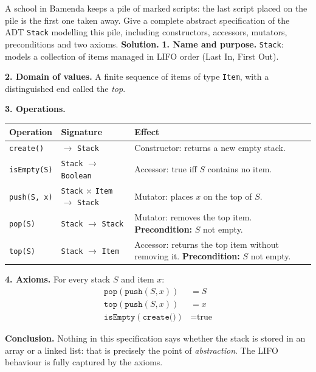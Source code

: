 \documentclass[11pt]{article}
\newcommand{\cle}[1]{{\popxbold\color{popdark}#1}}
\begin{document}
\begin{exoresolu}
A school in Bamenda keeps a pile of marked scripts: the last script placed on the pile is the first one taken away. Give a complete abstract specification of the ADT \texttt{Stack} modelling this pile, including constructors, accessors, mutators, preconditions and two axioms.
\tcblower
\textbf{Solution.}
\textbf{1. Name and purpose.} \texttt{Stack}: models a collection of items managed in \cle{LIFO} order (Last In, First Out).

\textbf{2. Domain of values.} A finite sequence of items of type \texttt{Item}, with a distinguished end called the \emph{top}.

\textbf{3. Operations.}
\begin{center}
\begin{tabularx}{\linewidth}{|l|l|X|}
\hline
\rowcolor{popblueL} \textbf{Operation} & \textbf{Signature} & \textbf{Effect} \\
\hline
\texttt{create()} & $\rightarrow$ \texttt{Stack} & Constructor: returns a new empty stack. \\
\hline
\texttt{isEmpty(S)} & \texttt{Stack} $\rightarrow$ \texttt{Boolean} & Accessor: true iff $S$ contains no item. \\
\hline
\texttt{push(S, x)} & \texttt{Stack} $\times$ \texttt{Item} $\rightarrow$ \texttt{Stack} & Mutator: places $x$ on the top of $S$. \\
\hline
\texttt{pop(S)} & \texttt{Stack} $\rightarrow$ \texttt{Stack} & Mutator: removes the top item. \textbf{Precondition:} $S$ not empty. \\
\hline
\texttt{top(S)} & \texttt{Stack} $\rightarrow$ \texttt{Item} & Accessor: returns the top item without removing it. \textbf{Precondition:} $S$ not empty. \\
\hline
\end{tabularx}
\end{center}

\textbf{4. Axioms.} For every stack $S$ and item $x$:
\begin{align*}
\texttt{pop}(\texttt{push}(S, x)) &= S \\
\texttt{top}(\texttt{push}(S, x)) &= x \\
\texttt{isEmpty}(\texttt{create()}) &= \text{true}
\end{align*}

\textbf{Conclusion.} Nothing in this specification says whether the stack is stored in an array or a linked list: that is precisely the point of \emph{abstraction}. The LIFO behaviour is fully captured by the axioms.
\end{exoresolu}
\end{document}
